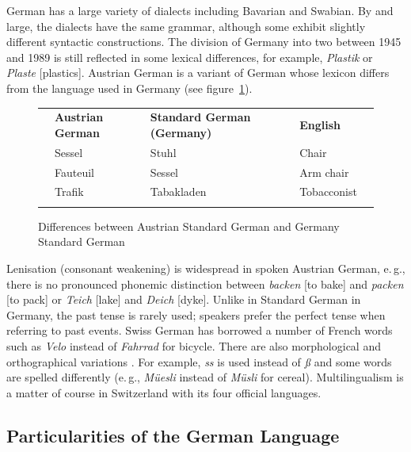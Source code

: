 \begin{multicols}{2}

German has a large variety of dialects including Bavarian and Swabian. By and large, the dialects have the same grammar, although some exhibit slightly different syntactic constructions. The division of Germany into two between 1945 and 1989 is still reflected in some lexical differences, for example, \textit{Plastik} or \textit{Plaste} {[}plastics{]}. Austrian German is a variant of German whose lexicon differs from the language used in Germany (see figure~\ref{atgetabelle2_en}).

\begin{figure}[htb]
  \setlength{\tabcolsep}{2em}
  \begin{tabularx}{\textwidth}{lllll} \toprule\addlinespace
    & \textbf{Austrian German} & \textbf{Standard German (Germany)} & \textbf{English} & \\ \addlinespace\midrule\addlinespace
    & Sessel   & Stuhl      & Chair & \\ 
    & Fauteuil & Sessel     & Arm chair & \\ 
    & Trafik   & Tabakladen & Tobacconist & \\ \addlinespace\bottomrule
  \end{tabularx}
  \caption{Differences between Austrian Standard German and Germany Standard German}
  \label{atgetabelle2_en}
\end{figure}

Lenisation (consonant weakening) is widespread in spoken Austrian German, e.\,g., there is no pronounced phonemic distinction between \textit{backen} {[}to bake{]} and \textit{packen} {[}to pack{]} or \textit{Teich} {[}lake{]} and \textit{Deich} {[}dyke{]}. Unlike in Standard German in Germany, the past tense is rarely used; speakers prefer the perfect tense when referring to past events.
Swiss German has borrowed a number of French words such as \textit{Velo} instead of \textit{Fahrrad} for bicycle. There are also morphological and orthographical variations \cite{Cano1}. For example, \textit{ss} is used instead of \textit{ß} and some words are spelled differently (e.\,g., \textit{Müesli} instead of \textit{Müsli} for cereal). Multilingualism is a matter of course in Switzerland with its four official languages.

\subsection{Particularities of the German Language}


\end{multicols}
